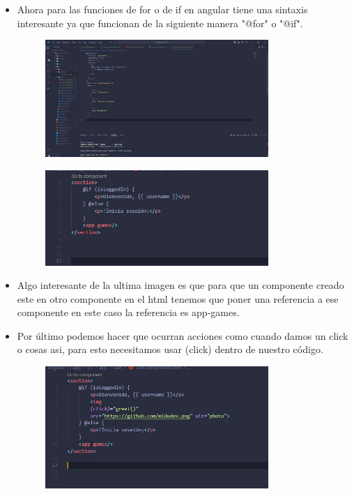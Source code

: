 \documentclass{article}
\begin{document}
\begin{itemize}
\begin{figure}[H]
		\end{figure}
		\item Ahora para las funciones de for o de if en angular tiene una sintaxis interesante ya que funcionan de la siguiente manera "@for" o "@if".
		\begin{figure}[H]
			\centering
			\includegraphics[width=0.8\textwidth,keepaspectratio]{img/comofuncionaforenAngular.jpg}
	
		\end{figure}
		\begin{figure}[H]
			\centering
			\includegraphics[width=0.8\textwidth,keepaspectratio]{img/paracolocarlousamosappgames.jpg}
	
		\end{figure}
		\item Algo interesante de la ultima imagen es que para que un componente creado este en otro componente en el html tenemos que poner una referencia a ese componente en este caso la referencia es app-games.
		\item Por último podemos hacer que ocurran acciones como cuando damos un click o cosas asi, para esto necesitamos usar (click) dentro de nuestro código.
		\begin{figure}[H]
			\centering
			\includegraphics[width=0.8\textwidth,keepaspectratio]{img/accionesconunclick.jpg}
	
		\end{figure}
	\end{itemize}
\end{document}
